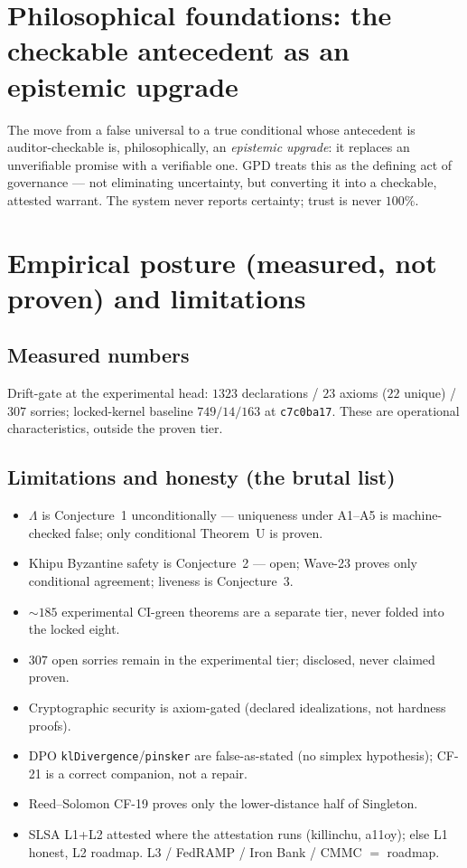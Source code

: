 \documentclass[11pt,letterpaper]{article}
\theoremstyle{definition}
\newcommand{\Lam}{\Lambda}
\begin{document}
\section{Philosophical foundations: the checkable antecedent as an epistemic upgrade}
The move from a false universal to a true conditional whose antecedent is
auditor-checkable is, philosophically, an \emph{epistemic upgrade}: it replaces
an unverifiable promise with a verifiable one. GPD treats this as the defining
act of governance --- not eliminating uncertainty, but converting it into a
checkable, attested warrant. The system never reports certainty; trust is never
$100\%$.

\section{Empirical posture (measured, not proven) and limitations}

\subsection{Measured numbers}
Drift-gate at the experimental head: $1323$ declarations / $23$ axioms ($22$
unique) / $307$ sorries; locked-kernel baseline $749/14/163$ at
\texttt{c7c0ba17}. These are operational characteristics, outside the proven
tier.

\subsection{Limitations and honesty (the brutal list)}
\begin{itemize}
\item $\Lam$ is Conjecture~1 unconditionally --- uniqueness under A1--A5 is
machine-checked false; only conditional Theorem~U is proven.
\item Khipu Byzantine safety is Conjecture~2 --- open; Wave-23 proves only
conditional agreement; liveness is Conjecture~3.
\item ${\sim}185$ experimental CI-green theorems are a separate tier, never
folded into the locked eight.
\item $307$ open sorries remain in the experimental tier; disclosed, never
claimed proven.
\item Cryptographic security is axiom-gated (declared idealizations, not hardness
proofs).
\item DPO \texttt{klDivergence}/\texttt{pinsker} are false-as-stated (no simplex
hypothesis); CF-21 is a correct companion, not a repair.
\item Reed--Solomon CF-19 proves only the lower-distance half of Singleton.
\item SLSA L1+L2 attested where the attestation runs (killinchu, a11oy); else L1
honest, L2 roadmap. L3 / FedRAMP / Iron Bank / CMMC $=$ roadmap.
\end{itemize}
\end{document}
